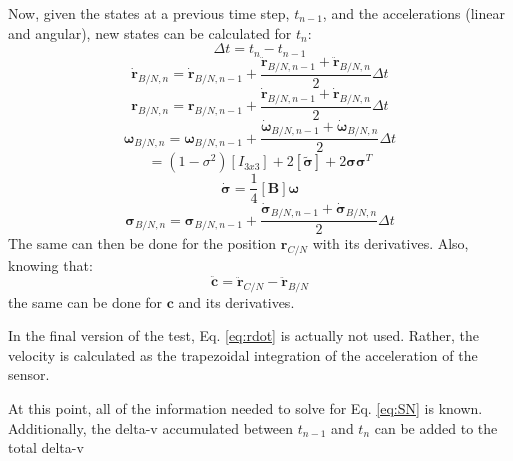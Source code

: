 Now, given the states at a previous time step, $t_{n-1}$, and the accelerations (linear and angular), new states can be calculated for $t_n$:
\begin{equation}
	\Delta t = t_{n} - t_{n-1}
\end{equation}
\begin{equation}
\dot{\bm{r}}_{B/N,n} = \dot{\bm{r}}_{B/N,n-1} + \frac{\ddot{\bm{r}}_{B/N,n-1}+\ddot{\bm{r}}_{B/N,n}}{2} \Delta t
\end{equation}
\begin{equation}
	\bm{r}_{B/N,n} = \bm{r}_{B/N,n-1} + \frac{\dot{\bm{r}}_{B/N,n-1}+\dot{\bm{r}}_{B/N,n}}{2} \Delta t
\end{equation}
\begin{equation}
\bm{\omega}_{B/N,n} = \bm{\omega}_{B/N,n-1} + \frac{\dot{\bm{\omega}}_{B/N,n-1}+\dot{\bm{\omega}}_{B/N,n}}{2} \Delta t
\end{equation}
\begin{equation}
[\bm{B}] = (1-\sigma^2)[I_{3x3}]+2[\tilde{\bm{\sigma}}] + 2\bm{\sigma}\bm{\sigma}^T
\end{equation}
\begin{equation}
	\bm{\dot{\sigma}} = \frac{1}{4} [\bm{B}] \bm{\omega}
\end{equation}
\begin{equation}
\bm{\sigma}_{B/N,n} = \bm{\sigma}_{B/N,n-1} + \frac{\dot{\bm{\sigma}}_{B/N,n-1}+\dot{\bm{\sigma}}_{B/N,n}}{2} \Delta t
\end{equation}
The same can then be done for the position $ {\bm{r}}_{C/N}$ with its derivatives. Also, knowing that:
\begin{equation}
\ddot{\bm{c}} = \ddot{\bm{r}}_{C/N} - \ddot{\bm{r}}_{B/N}
\end{equation}
the same can be done for $\bm{c}$ and its derivatives. 

In the final version of the test, Eq. \ref{eq:rdot} is actually not used. Rather, the velocity is calculated as the trapezoidal integration of the acceleration of the sensor.

At this point, all of the information needed to solve for Eq. \ref{eq:SN} is known. Additionally, the delta-v accumulated between $t_{n-1}$ and $t_{n}$ can be added to the total delta-v
